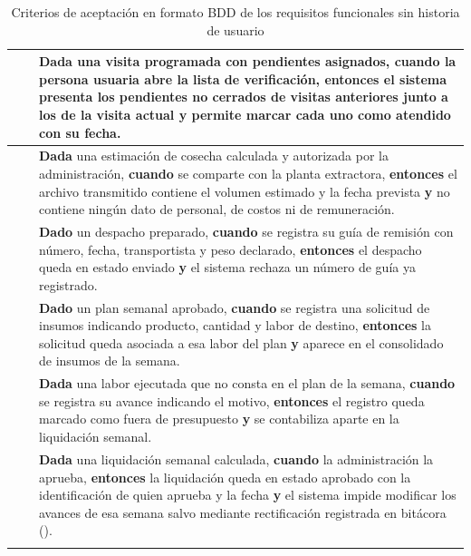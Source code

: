 \begin{longtable}{|C{1.5cm}|C{1.5cm}|L{12.4cm}|}
 &  & \textbf{Dada} una visita programada con pendientes asignados, \textbf{cuando} la persona usuaria abre la lista de verificación, \textbf{entonces} el sistema presenta los pendientes no cerrados de visitas anteriores junto a los de la visita actual \textbf{y} permite marcar cada uno como atendido con su fecha. \\ \hline

 &  & \textbf{Dada} una estimación de cosecha calculada y autorizada por la administración, \textbf{cuando} se comparte con la planta extractora, \textbf{entonces} el archivo transmitido contiene el volumen estimado y la fecha prevista \textbf{y} no contiene ningún dato de personal, de costos ni de remuneración. \\ \hline

 &  & \textbf{Dado} un despacho preparado, \textbf{cuando} se registra su guía de remisión con número, fecha, transportista y peso declarado, \textbf{entonces} el despacho queda en estado enviado \textbf{y} el sistema rechaza un número de guía ya registrado. \\ \hline

 &  & \textbf{Dado} un plan semanal aprobado, \textbf{cuando} se registra una solicitud de insumos indicando producto, cantidad y labor de destino, \textbf{entonces} la solicitud queda asociada a esa labor del plan \textbf{y} aparece en el consolidado de insumos de la semana. \\ \hline

 &  & \textbf{Dada} una labor ejecutada que no consta en el plan de la semana, \textbf{cuando} se registra su avance indicando el motivo, \textbf{entonces} el registro queda marcado como fuera de presupuesto \textbf{y} se contabiliza aparte en la liquidación semanal. \\ \hline

 &  & \textbf{Dada} una liquidación semanal calculada, \textbf{cuando} la administración la aprueba, \textbf{entonces} la liquidación queda en estado aprobado con la identificación de quien aprueba y la fecha \textbf{y} el sistema impide modificar los avances de esa semana salvo mediante rectificación registrada en bitácora (). \\ \hline

\caption{Criterios de aceptación en formato BDD de los requisitos funcionales sin historia de usuario}
\end{longtable}

